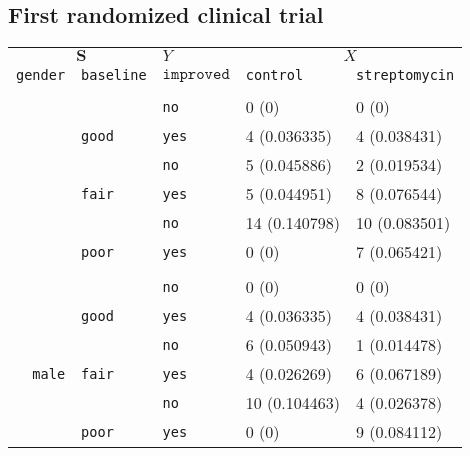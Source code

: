 \documentclass[10pt]{article}
\newcommand{\tablecolor}{beaublue}
\begin{document}
\subsection{First randomized clinical trial}
\label{ssc:1948}

\begin{table}[t]
\renewcommand{\arraystretch}{1.05}
    \centering
    \begin{tabular}{rll|ll}
    \multicolumn{2}{c}{$\boldsymbol S$\phantom{...}} & $Y$ & \multicolumn{2}{c}{$X$\phantom{.....}}
    \\ %
         \texttt{gender} & \texttt{baseline} & $\texttt{improved}$ & \texttt{control} & \texttt{streptomycin} \\ \hline &&&&\\[-2.5ex]
                        &  & \texttt{no} & \phantom{0}0 (0) & \phantom{0}0 (0)\\
                        &  \multirow{-2}{*}{\texttt{good}}  & \texttt{yes} & \phantom{0}4 (0.036335) & \phantom{0}4 (0.038431)\\%
        \rowcolor{\tablecolor}                
         & & \texttt{no} & \phantom{0}5 (0.045886) & \phantom{0}2 (0.019534) \\
        \rowcolor{\tablecolor}%
        \multirow{-2}{*}{\texttt{female}} &  \multirow{-2}{*}{\texttt{fair}} & \texttt{yes} & \phantom{0}5 (0.044951) & \phantom{0}8 (0.076544)\\%
                        & & \texttt{no} & 14 (0.140798) & 10 (0.083501)\\ 
                        &  \multirow{-2}{*}{\texttt{poor}}  & \texttt{yes} & \phantom{0}0 (0) & \phantom{0}7 (0.065421)\\[.5ex]
        \hdashline&&&&\\[-2ex]
        \rowcolor{\tablecolor} 
                        & & \texttt{no} & \phantom{0}0 (0) & \phantom{0}0 (0)\\
        \rowcolor{\tablecolor} 
                        &  \multirow{-2}{*}{\texttt{good}}  & \texttt{yes} & \phantom{0}4 (0.036335) & \phantom{0}4 (0.038431)\\ %
                        &  & \texttt{no} & \phantom{0}6 (0.050943) & \phantom{0}1 (0.014478) \\
        \multirow{-2}{*}{\texttt{male}}  & \multirow{-2}{*}{\texttt{fair}} & \texttt{yes} & \phantom{0}4 (0.026269) & \phantom{0}6 (0.067189)\\ %
        \rowcolor{\tablecolor} 
                        &  & \texttt{no} & 10 (0.104463) & \phantom{0}4 (0.026378)\\ 
        \rowcolor{\tablecolor} 
                        & \multirow{-2}{*}{\texttt{poor}} & \texttt{yes} & \phantom{0}0 (0) & \phantom{0}9 (0.084112)\\%
                        

\end{tabular}
\end{table}
\end{document}
